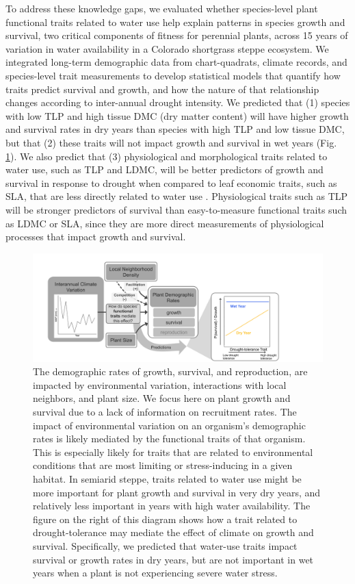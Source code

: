 \documentclass[12pt, letterpaper]{article}
\begin{document}
To address these knowledge gaps, we evaluated whether species-level plant functional traits related to water use help explain patterns in species growth and survival, two critical components of fitness for perennial plants, across 15 years of variation in water availability in a Colorado shortgrass steppe ecosystem. We integrated long-term demographic data from chart-quadrats, climate records, and species-level trait measurements to develop statistical models that quantify how traits predict survival and growth, and how the nature of that relationship changes according to inter-annual drought intensity. We predicted that (1) species with low TLP and high tissue DMC (dry matter content) will have higher growth and survival rates in dry years than species with high TLP and low tissue DMC, but that (2) these traits will not impact growth and survival in wet years (Fig. \ref{fig:ConceptFig}). We also predict that (3) physiological and morphological traits related to water use, such as TLP and LDMC, will be better predictors of growth and survival in response to drought when compared to leaf economic traits, such as SLA, that are less directly related to water use \cite{Wright2004, Reich2014}. Physiological traits such as TLP will be stronger predictors of survival than easy-to-measure functional traits such as LDMC or SLA, since they are more direct measurements of physiological processes that impact growth and survival. 
\begin{figure}
\includegraphics[width=1\textwidth]{CO_sgs_ConceptualFigure.pdf}
\caption{\internallinenumbers\small{
The demographic rates of growth, survival, and reproduction, are impacted by environmental variation, interactions with local neighbors, and plant size. We focus here on plant growth and survival due to a lack of information on recruitment rates. The impact of environmental variation on an organism's demographic rates is likely mediated by the functional traits of that organism. This is especially likely for traits that are related to environmental conditions that are most limiting or stress-inducing in a given habitat. In semiarid steppe, traits related to water use might be more important for plant growth and survival in very dry years, and relatively less important in years with high water availability. The figure on the right of this diagram shows how a trait related to drought-tolerance may mediate the effect of climate on growth and survival. Specifically, we predicted that water-use traits impact survival or growth rates in dry years, but are not important in wet years when a plant is not experiencing severe water stress. 
}
}
\label{fig:ConceptFig}
\end{figure}
\end{document}
